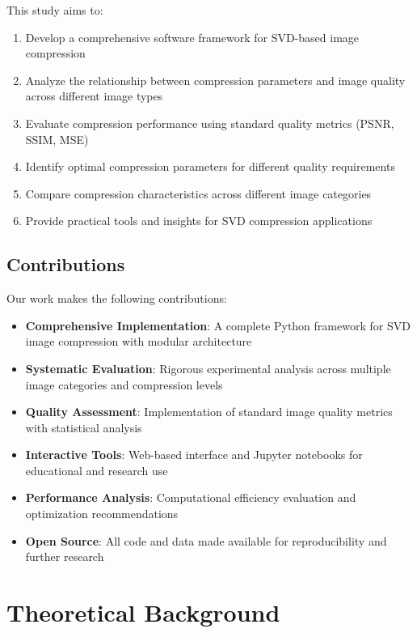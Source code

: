 \documentclass[12pt,a4paper]{article}
\begin{document}
This study aims to:

\begin{enumerate}
    \item Develop a comprehensive software framework for SVD-based image compression
    \item Analyze the relationship between compression parameters and image quality across different image types
    \item Evaluate compression performance using standard quality metrics (PSNR, SSIM, MSE)
    \item Identify optimal compression parameters for different quality requirements
    \item Compare compression characteristics across different image categories
    \item Provide practical tools and insights for SVD compression applications
\end{enumerate}

\subsection{Contributions}

Our work makes the following contributions:

\begin{itemize}
    \item \textbf{Comprehensive Implementation}: A complete Python framework for SVD image compression with modular architecture
    \item \textbf{Systematic Evaluation}: Rigorous experimental analysis across multiple image categories and compression levels
    \item \textbf{Quality Assessment}: Implementation of standard image quality metrics with statistical analysis
    \item \textbf{Interactive Tools}: Web-based interface and Jupyter notebooks for educational and research use
    \item \textbf{Performance Analysis}: Computational efficiency evaluation and optimization recommendations
    \item \textbf{Open Source}: All code and data made available for reproducibility and further research
\end{itemize}

\section{Theoretical Background}
\end{document}
